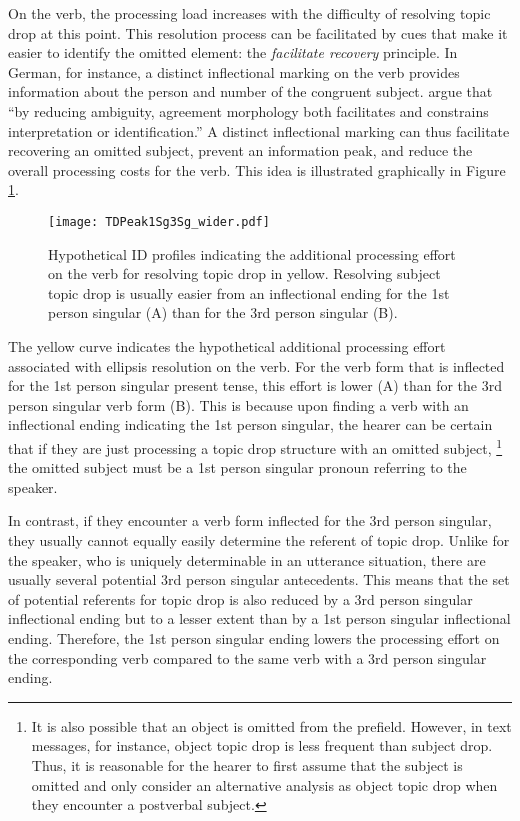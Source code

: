 On the verb, the processing load  increases with the difficulty of resolving topic drop at this point.
This resolution process can be facilitated by cues that make it easier to identify the omitted element: the \textit{facilitate recovery} principle.
In German, for instance, a distinct inflectional marking on the verb  provides information about the person and number of the congruent subject.
\citet[70--71]{sigurdsson.maling2010} argue that ``by reducing ambiguity,  agreement morphology both facilitates and constrains interpretation or identification.''
A distinct inflectional  marking can thus facilitate recovering an omitted subject, prevent an information peak, and reduce the overall processing costs for the verb.
This idea is illustrated graphically in Figure \ref{fig:uid.peak.verb}.

\begin{figure}
\centering
\texttt{[image: TDPeak1Sg3Sg\_wider.pdf]}
\caption{Hypothetical ID profiles indicating the additional processing effort on the verb for resolving topic drop in yellow.
Resolving subject topic drop is usually easier from an inflectional ending for the 1st person singular (A) than for the 3rd person singular (B).}
\label{fig:uid.peak.verb}
\end{figure}

The yellow curve indicates the hypothetical additional processing effort associated with ellipsis resolution on the verb.
For the verb form that is inflected for the 1st person singular present tense, this effort is lower (A) than for the 3rd person singular verb form (B).
This is because upon finding a verb with an inflectional  ending indicating the 1st person singular, the hearer can be certain that if they are just processing a topic drop structure with an omitted subject,%
\footnote{It is also possible that an object is omitted from the prefield.
However, in text messages, for instance, object topic drop is less frequent than subject drop.
Thus, it is reasonable for the hearer to first assume that the subject is omitted and only consider an alternative analysis as object topic drop  when they encounter a postverbal subject.
}
%
the omitted subject must be a 1st person singular pronoun referring to the speaker.

In contrast, if they encounter a verb form inflected for the 3rd person singular, they usually cannot equally easily determine the referent of topic drop.
Unlike for the speaker, who is uniquely determinable in an utterance situation, there are usually several potential 3rd person singular antecedents. 
This means that the set of potential referents for topic drop is also reduced by a 3rd person singular inflectional ending  but to a lesser extent than by a 1st person singular inflectional ending.
Therefore, the 1st person singular ending lowers the processing effort on the corresponding verb compared to the same verb with a 3rd person singular ending.

